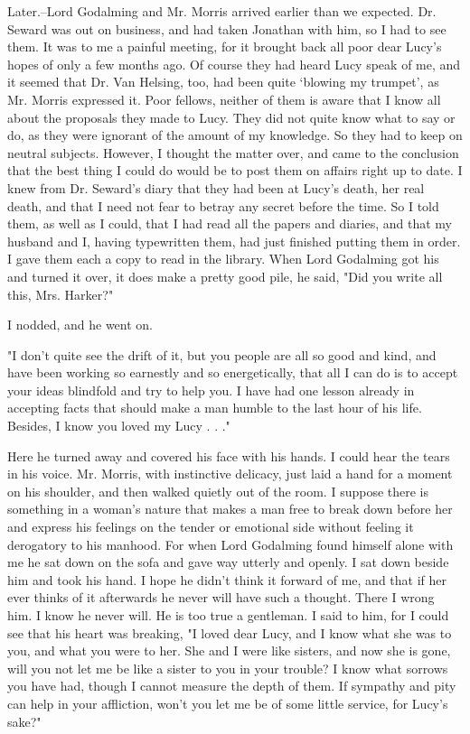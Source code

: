 Later.--Lord Godalming and Mr. Morris arrived earlier than we expected. Dr. Seward was out on business, and had taken Jonathan with him, so I had to see them. It was to me a painful meeting, for it brought back all poor dear Lucy's hopes of only a few months ago. Of course they had heard Lucy speak of me, and it seemed that Dr. Van Helsing, too, had been quite `blowing my trumpet', as Mr. Morris expressed it. Poor fellows, neither of them is aware that I know all about the proposals they made to Lucy. They did not quite know what to say or do, as they were ignorant of the amount of my knowledge. So they had to keep on neutral subjects. However, I thought the matter over, and came to the conclusion that the best thing I could do would be to post them on affairs right up to date. I knew from Dr. Seward's diary that they had been at Lucy's death, her real death, and that I need not fear to betray any secret before the time. So I told them, as well as I could, that I had read all the papers and diaries, and that my husband and I, having typewritten them, had just finished putting them in order. I gave them each a copy to read in the library. When Lord Godalming got his and turned it over, it does make a pretty good pile, he said, "Did you write all this, Mrs. Harker?" 

I nodded, and he went on. 

"I don't quite see the drift of it, but you people are all so good and kind, and have been working so earnestly and so energetically, that all I can do is to accept your ideas blindfold and try to help you. I have had one lesson already in accepting facts that should make a man humble to the last hour of his life. Besides, I know you loved my Lucy . . ." 

Here he turned away and covered his face with his hands. I could hear the tears in his voice. Mr. Morris, with instinctive delicacy, just laid a hand for a moment on his shoulder, and then walked quietly out of the room. I suppose there is something in a woman's nature that makes a man free to break down before her and express his feelings on the tender or emotional side without feeling it derogatory to his manhood. For when Lord Godalming found himself alone with me he sat down on the sofa and gave way utterly and openly. I sat down beside him and took his hand. I hope he didn't think it forward of me, and that if her ever thinks of it afterwards he never will have such a thought. There I wrong him. I know he never will. He is too true a gentleman. I said to him, for I could see that his heart was breaking, "I loved dear Lucy, and I know what she was to you, and what you were to her. She and I were like sisters, and now she is gone, will you not let me be like a sister to you in your trouble? I know what sorrows you have had, though I cannot measure the depth of them. If sympathy and pity can help in your affliction, won't you let me be of some little service, for Lucy's sake?" 

